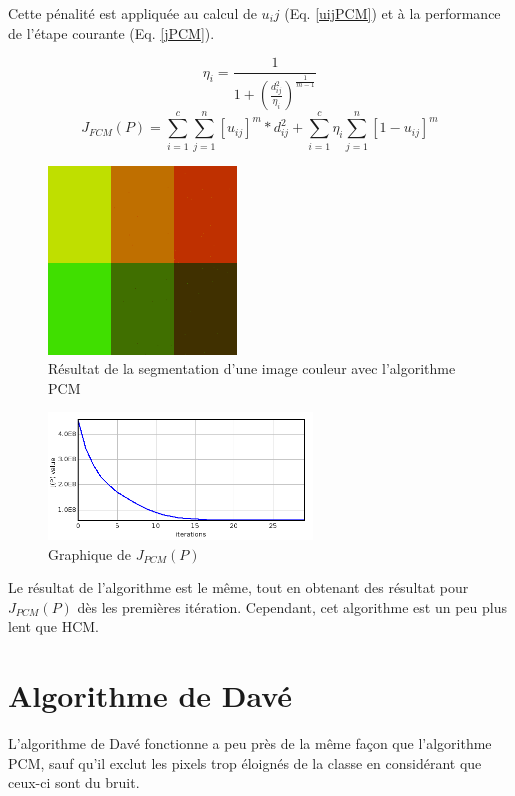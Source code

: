 \documentclass[a4paper,11pt]{article}
\begin{document}
Cette pénalité est appliquée au calcul de $u_ij$ (Eq. \ref{uijPCM}) et à la performance de l'étape courante (Eq. \ref{jPCM}).

\begin{equation}
  \label{uijPCM}
  \eta_i = \frac{1}{1+\left(\frac{d_{ij}^2}{\eta_i}\right)^{\frac{1}{m-1}}}
\end{equation}
\begin{equation}
  \label{jPCM}
  J_{FCM}(P)=\sum_{i=1}^{c}\sum_{j=1}^{n}[u_{ij}]^m * d_{ij}^2+\sum_{i=1}^{c}\eta_i \sum_{j=1}^{n}[1 - u_{ij}]^m
\end{equation}

\begin{figure}[!h]
  \begin{center}
    \includegraphics[width=5cm]{resultat/PCM.png}
    \caption{Résultat de la segmentation d'une image couleur avec l'algorithme PCM}
    \label{fig:pcm}
  \end{center}
\end{figure}

\begin{figure}[!h]
  \begin{center}
    \includegraphics[width=7cm]{resultat/PCM_graph.png}
    \caption{Graphique de $J_{PCM}(P)$}
    \label{fig:graphPCM}
  \end{center}
\end{figure}

Le résultat de l'algorithme est le même, tout en obtenant des résultat pour $J_{PCM}(P)$ dès les premières itération.
Cependant, cet algorithme est un peu plus lent que HCM.

\section{Algorithme de Davé}
L'algorithme de Davé fonctionne a peu près de la même façon que l'algorithme PCM, sauf qu'il exclut
les pixels trop éloignés de la classe en considérant que ceux-ci sont du bruit.
\end{document}
